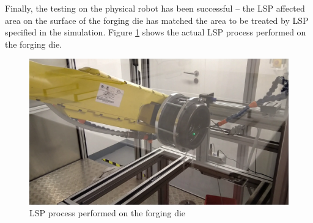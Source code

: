 Finally, the testing on the physical robot has been successful -- the LSP affected area on the surface of the forging die has matched the area to be treated by LSP specified in the simulation. Figure \ref{fig:peening} shows the actual LSP process performed on the forging die. 

\begin{figure}[h]
    \centering
    \includegraphics[width=0.9\linewidth]{img/peening.png}
    \caption{LSP process performed on the forging die}
    \label{fig:peening}
\end{figure}



